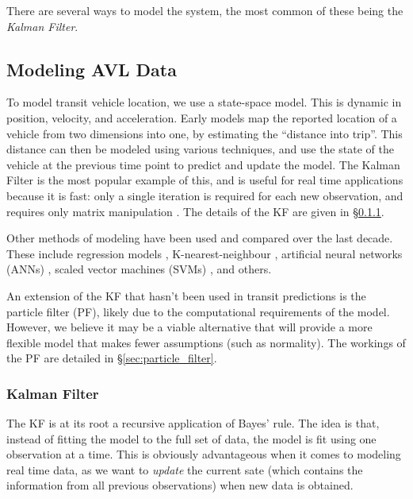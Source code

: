\documentclass[12pt,a4paper]{article}
\begin{document}
There are several ways to model the system, the most common of these being the \emph{Kalman Filter}.



\subsection{Modeling AVL Data}

To model transit vehicle location, we use a state-space model.
This is dynamic in position, velocity, and acceleration.
Early models map the reported location of a vehicle from two dimensions into one,
by estimating the ``distance into trip''.
This distance can then be modeled using various techniques, 
and use the state of the vehicle at the previous time point to predict and update the model.
The Kalman Filter is the most popular example of this, and is useful for real time applications
because it is fast: only a single iteration is required for each new observation, and requires only matrix manipulation
\citep{cathey-dailey:2003,cn}.
The details of the KF are given in \S\ref{sec:kalman_filter}.


Other methods of modeling have been used and compared over the last decade.
These include regression models \citep{cn}, 
K-nearest-neighbour \citep{cn}, 
artificial neural networks (ANNs) \citep{cn},
scaled vector machines (SVMs) \citep{cn}, 
and others.


An extension of the KF that hasn't been used in transit predictions is the particle filter (PF),
likely due to the computational requirements of the model.
However, we believe it may be a viable alternative that will provide a more flexible model that
makes fewer assumptions (such as normality).
The workings of the PF are detailed in \S\ref{sec:particle_filter}.



\subsubsection{Kalman Filter}
\label{sec:kalman_filter}

The KF is at its root a recursive application of Bayes' rule.
The idea is that, instead of fitting the model to the full set of data,
the model is fit using one observation at a time.
This is obviously advantageous when it comes to modeling real time data,
as we want to \emph{update} the current sate (which contains the information from all previous observations)
when new data is obtained.
\end{document}
